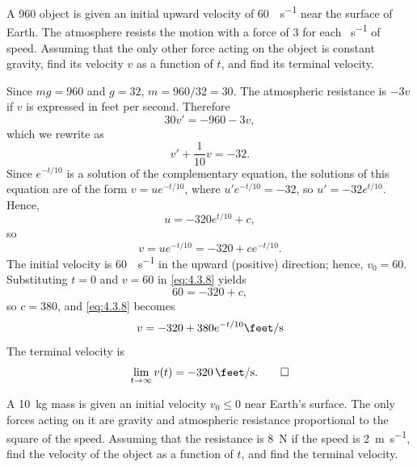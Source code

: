 \begin{example}\label{example:4.3.2}
A \qty{960}{\pound} object is given an initial upward velocity of \qty{60}{\feet\per\second} near
the surface of Earth. The atmosphere resists the motion with a force
of \qty{3}{\pound} for each \unit{\feet\per\second} of speed. Assuming that the only other force
acting on the object is constant gravity, find its velocity $v$ as a
function of $t$, and find its  terminal velocity.
\end{example}

\begin{solution}
Since $mg=960$ and $g=32$,   $m=960/32=30$.  The atmospheric
resistance is $-3v$ \unit{\pound} if $v$ is expressed in feet
per second.  Therefore
\[
30v'=-960-3v,
\]
which we rewrite as
\[
v'+\frac{1}{10}v=-32.
\]
Since $e^{-t/10}$ is a solution of the complementary equation, the
solutions of this equation are of the form $v=ue^{-t/10}$, where
$u'e^{-t/10}=-32$, so $u'=-32e^{t/10}$. Hence,
\[
u=-320 e^{t/10}+c,
\]
so
\begin{equation} \label{eq:4.3.8}
v=ue^{-t/10}=-320+ce^{-t/10}.
\end{equation}
The initial velocity is \qty{60}{\feet\per\second} in the upward (positive) direction;
hence, $v_0=60$. Substituting $t=0$ and $v=60$ in \eqref{eq:4.3.8}
yields
\[
60=-320+c,
\]
 so $c=380$, and \eqref{eq:4.3.8} becomes
\[
v=-320+380e^{-t/10}\unit{\feet\per\second}
\]
The terminal velocity is
\[
\lim_{t\to\infty}v(t)=\qty{-320}{\feet\per\second}.\qedhere
\]
\end{solution}


\begin{example}\label{example:4.3.3}
A \qty{10}{\kilo\gram} mass is given an initial velocity $v_0\le0$
 near Earth's surface. The only forces acting on it are
gravity and atmospheric resistance proportional to the square of the
speed. Assuming that the resistance is \qty{8}{\newton} if the speed is \qty{2}{\meter\per\second},
find the velocity of the object as a function of $t$, and
find the terminal velocity.
\end{example}

